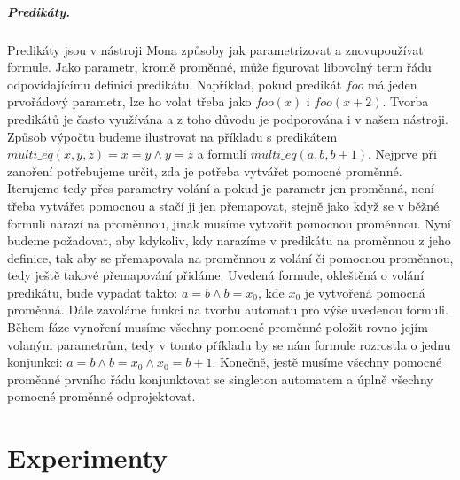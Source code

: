 \paragraph{Predikáty.} Predikáty jsou v nástroji Mona způsoby jak parametrizovat a znovupoužívat formule. Jako parametr, kromě proměnné, může figurovat libovolný term řádu odpovídajícímu definici predikátu. Například, pokud predikát $foo$ má jeden prvořádový parametr, lze ho volat třeba jako $foo(x)$ i $foo(x + 2)$. Tvorba predikátů je často využívána a z toho důvodu je podporována i v našem nástroji. Způsob výpočtu budeme ilustrovat na příkladu s predikátem $multi\_eq(x,y,z) = x = y \wedge y = z$ a formulí $multi\_eq(a,b,b+1)$. Nejprve při zanoření potřebujeme určit, zda je potřeba vytvářet pomocné proměnné. Iterujeme tedy přes parametry volání a pokud je parametr jen proměnná, není třeba vytvářet pomocnou a stačí ji jen přemapovat, stejně jako když se v běžné formuli narazí na proměnnou, jinak musíme vytvořit pomocnou proměnnou. Nyní budeme požadovat, aby kdykoliv, kdy narazíme v predikátu na proměnnou z jeho definice, tak aby se přemapovala na proměnnou z volání či pomocnou proměnnou, tedy ještě takové přemapování přidáme. Uvedená formule, okleštěná o volání predikátu, bude vypadat takto: $a = b \wedge b = x_0$, kde $x_0$ je vytvořená pomocná proměnná. Dále zavoláme funkci na tvorbu automatu pro výše uvedenou formuli. Během fáze vynoření musíme všechny pomocné proměnné položit rovno jejím volaným parametrům, tedy v tomto příkladu by se nám formule rozrostla o jednu konjunkci: $a = b \wedge b = x_0 \wedge x_0 = b + 1$. Konečně, jestě musíme všechny pomocné proměnné prvního řádu konjunktovat se singleton automatem a úplně všechny pomocné proměnné odprojektovat.



\chapter{Experimenty}
\label{4_experimenty}

